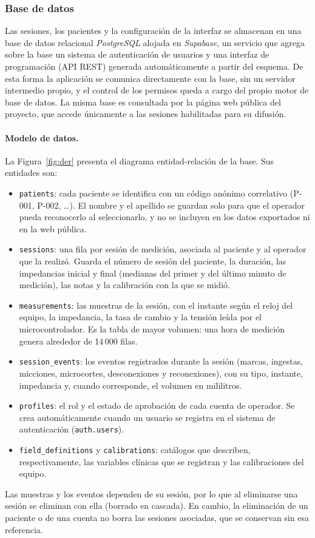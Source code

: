 \subsubsection{Base de datos}
\label{sec:base_datos}
Las sesiones, los pacientes y la configuración de la interfaz se almacenan en una base de datos relacional \textit{PostgreSQL} alojada en \textit{Supabase}, un servicio que agrega sobre la base un sistema de autenticación de usuarios y una interfaz de programación (API REST) generada automáticamente a partir del esquema. De esta forma la aplicación se comunica directamente con la base, sin un servidor intermedio propio, y el control de los permisos queda a cargo del propio motor de base de datos. La misma base es consultada por la página web pública del proyecto, que accede únicamente a las sesiones habilitadas para su difusión.

\paragraph{Modelo de datos.} La Figura~\ref{fig:der} presenta el diagrama entidad-relación de la base. Sus entidades son:
\begin{itemize}
    \item \texttt{patients}: cada paciente se identifica con un código anónimo correlativo (P-001, P-002, \dots). El nombre y el apellido se guardan solo para que el operador pueda reconocerlo al seleccionarlo, y no se incluyen en los datos exportados ni en la web pública.
    \item \texttt{sessions}: una fila por sesión de medición, asociada al paciente y al operador que la realizó. Guarda el número de sesión del paciente, la duración, las impedancias inicial y final (medianas del primer y del último minuto de medición), las notas y la calibración con la que se midió.
    \item \texttt{measurements}: las muestras de la sesión, con el instante según el reloj del equipo, la impedancia, la tasa de cambio y la tensión leída por el microcontrolador. Es la tabla de mayor volumen: una hora de medición genera alrededor de 14\,000 filas.
    \item \texttt{session\_events}: los eventos registrados durante la sesión (marcas, ingestas, micciones, microcortes, desconexiones y reconexiones), con su tipo, instante, impedancia y, cuando corresponde, el volumen en mililitros.
    \item \texttt{profiles}: el rol y el estado de aprobación de cada cuenta de operador. Se crea automáticamente cuando un usuario se registra en el sistema de autenticación (\texttt{auth.users}).
    \item \texttt{field\_definitions} y \texttt{calibrations}: catálogos que describen, respectivamente, las variables clínicas que se registran y las calibraciones del equipo.
\end{itemize}
Las muestras y los eventos dependen de su sesión, por lo que al eliminarse una sesión se eliminan con ella (borrado en cascada). En cambio, la eliminación de un paciente o de una cuenta no borra las sesiones asociadas, que se conservan sin esa referencia.

